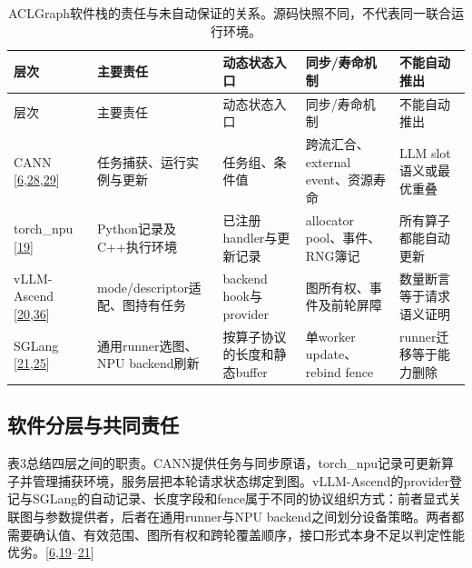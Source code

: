 \documentclass[
  UTF8,
  zihao=5]{ctexart}
\begin{document}
\begin{longtable}[]{@{}
  >{\raggedright\arraybackslash}p{}
  >{\raggedright\arraybackslash}p{}
  >{\raggedright\arraybackslash}p{}
  >{\raggedright\arraybackslash}p{}
  >{\raggedright\arraybackslash}p{}@{}}
\caption{ACLGraph软件栈的责任与未自动保证的关系。源码快照不同，不代表同一联合运行环境。}\tabularnewline
\toprule
层次 & 主要责任 & 动态状态入口 & 同步/寿命机制 & 不能自动推出 \\
\midrule
\endfirsthead
\toprule
层次 & 主要责任 & 动态状态入口 & 同步/寿命机制 & 不能自动推出 \\
\midrule
\endhead
CANN
{[}\protect\hyperlink{ref-cann910update}{6},\protect\hyperlink{ref-cann910single}{28},\protect\hyperlink{ref-cann910multi}{29}{]}
& 任务捕获、运行实例与更新 & 任务组、条件值 & 跨流汇合、external
event、资源寿命 & LLM slot语义或最优重叠 \\
torch\_npu {[}\protect\hyperlink{ref-torchnpu2026graphs}{19}{]} &
Python记录及C++执行环境 & 已注册handler与更新记录 & allocator
pool、事件、RNG簿记 & 所有算子都能自动更新 \\
vLLM-Ascend
{[}\protect\hyperlink{ref-vllmascend2026impl}{20},\protect\hyperlink{ref-vllmascenddesign}{36}{]}
& mode/descriptor适配、图持有任务 & backend hook与provider &
图所有权、事件及前轮屏障 & 数量断言等于请求语义证明 \\
SGLang
{[}\protect\hyperlink{ref-sglang2026impl}{21},\protect\hyperlink{ref-sglang2026refactor}{25}{]}
& 通用runner选图、NPU backend刷新 & 按算子协议的长度和静态buffer &
单worker update、rebind fence & runner迁移等于能力删除 \\
\bottomrule
\end{longtable}

\hypertarget{ux8f6fux4ef6ux5206ux5c42ux4e0eux5171ux540cux8d23ux4efb}{%
\subsection{软件分层与共同责任}\label{ux8f6fux4ef6ux5206ux5c42ux4e0eux5171ux540cux8d23ux4efb}}

表3总结四层之间的职责。CANN提供任务与同步原语，torch\_npu记录可更新算子并管理捕获环境，服务层把本轮请求状态绑定到图。vLLM-Ascend的provider登记与SGLang的自动记录、长度字段和fence属于不同的协议组织方式：前者显式关联图与参数提供者，后者在通用runner与NPU
backend之间划分设备策略。两者都需要确认值、有效范围、图所有权和跨轮覆盖顺序，接口形式本身不足以判定性能优劣。{[}\protect\hyperlink{ref-cann910update}{6},\protect\hyperlink{ref-torchnpu2026graphs}{19}--\protect\hyperlink{ref-sglang2026impl}{21}{]}
\end{document}
